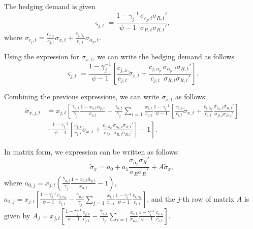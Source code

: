 The hedging demand is given 
\begin{equation}
    \varsigma_{j,t} = \frac{1-\gamma_j^{-1}}{\psi-1} \frac{\sigma_{c_j,t} \sigma_{R,t}'}{\sigma_{R,t}\sigma_{R,t}'},
\end{equation}
where $\sigma_{c_j,t} = \frac{c_{j,x}}{c_{j,t}} \sigma_{x,t} + \frac{c_{j,\overline{\alpha}_p}}{c_{j,t}} \sigma_{\overline{\alpha}_p,t}$.

Using the expression for $\sigma_{x,t}$, we can write the hedging demand as follows
\begin{equation}
    \varsigma_{j,t} = \frac{1-\gamma_j^{-1}}{\psi-1} \left[\frac{c_{j,x}}{c_{j,t}} \tilde{\sigma}_{x,t}+\frac{c_{j,\overline{\alpha}_p}}{c_{j,t}} \frac{\sigma_{\overline{\alpha}_p,t} \sigma_{R,t}'}{\sigma_{R,t}\sigma_{R,t}'}\right].
\end{equation}

Combining the previous expressions, we can write $\widetilde{\sigma}_{x,t}$ as follows:
\begin{align}
    \widetilde{\sigma}_{x,j,t} &= x_{j,t} \left[ \frac{\gamma_{u,t}}{\gamma_j} \frac{1-x_{0,t} \overline{\alpha}_{p,t}}{x_{u,t}} - \frac{\gamma_{u,t}}{\gamma_j} \sum_{i=1} \frac{x_{i,t}}{x_{u,t}} \frac{1-\gamma_i^{-1}}{\psi-1} \left[\frac{c_{i,x}}{c_{i,t}} \tilde{\sigma}_{x,t}+\frac{c_{i,\overline{\alpha}_p}}{c_{i,t}} \frac{\sigma_{\overline{\alpha}_p,t} \sigma_{R,t}'}{\sigma_{R,t}\sigma_{R,t}'}\right] \right.\nonumber\\
    &\left.+ \frac{1-\gamma_j^{-1}}{\psi-1} \left[\frac{c_{j,x}}{c_{j,t}} \tilde{\sigma}_{x,t}+\frac{c_{j,\overline{\alpha}_p}}{c_{j,t}} \frac{\sigma_{\overline{\alpha}_p,t} \sigma_{R,t}'}{\sigma_{R,t}\sigma_{R,t}'}\right]-1\right].
\end{align}

In matrix form, we expression can be written as follows:
\begin{equation}
    \widetilde{\sigma}_{x} = a_{0} + a_1 \frac{\sigma_{\overline{\alpha}_p} \sigma_{R}'}{\sigma_{R}\sigma_{R}'} + A \widetilde{\sigma}_x,
\end{equation}
where $a_{0,j} = x_{j,t} \left( \frac{\gamma_{u,t}}{\gamma_j} \frac{1-x_{0,t} \overline{\alpha}_{p,t}}{x_{u,t}}  - 1\right) $, $a_{1,j} = x_{j,t} \left[ \frac{1-\gamma_j^{-1}}{\psi-1} \frac{c_{j,\overline{\alpha}_p}}{c_{j,t}} -  
\frac{\gamma_{u,t}}{\gamma_j} \sum_{j=1} \frac{x_{i,t}}{x_{u,t}} \frac{1-\gamma_i^{-1}}{\psi-1} \frac{c_{i,\overline{\alpha}_p}}{c_{i,t}}
\right]$, and the $j$-th row of matrix $A$ is given by $A_j = x_{j,t} \left[ \frac{1-\gamma_j^{-1}}{\psi-1} \frac{c_{j,x}}{c_{j,t}} - \frac{\gamma_{u,t}}{\gamma_j} \sum_{i=1} \frac{x_{i,t}}{x_{u,t}} \frac{1-\gamma_i^{-1}}{\psi-1} \frac{c_{i,x}}{c_{i,t}} \right] $.

